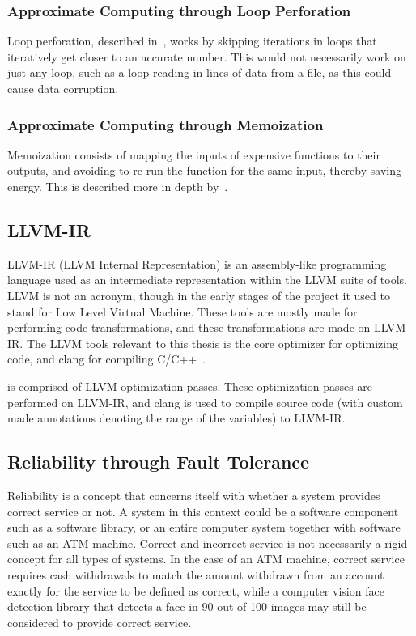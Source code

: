 \subsubsection{Approximate Computing through Loop Perforation}

Loop perforation, described in~\citet{li2018sculptor}, works by skipping iterations in loops that iteratively get closer to an accurate number. This would not necessarily work on just any loop, such as a loop reading in lines of data from a file, as this could cause data corruption.

\subsubsection{Approximate Computing through Memoization}

Memoization consists of mapping the inputs of expensive functions to their outputs, and avoiding to re-run the function for the same input, thereby saving energy. This is described more in depth by~\citet{mittal2016survey}.

\subsection{LLVM-IR}
LLVM-IR (LLVM Internal Representation) is an assembly-like programming language used as an intermediate representation within the LLVM suite of tools. LLVM is not an acronym, though in the early stages of the project it used to stand for Low Level Virtual Machine. These tools are mostly made for performing code transformations, and these transformations are made on LLVM-IR. The LLVM tools relevant to this thesis is the core optimizer for optimizing code, and clang for compiling C/C++~\citep{LLVM_homepage}.  %

\taffo{} is comprised of LLVM optimization passes. These optimization passes are performed on LLVM-IR, and clang is used to compile source code (with custom made annotations denoting the range of the variables) to LLVM-IR. %



\subsection{Reliability through Fault Tolerance}\label{section:Reliability_thorugh_fault_tolerance}
Reliability is a concept that concerns itself with whether a system provides correct service or not. A system in this context could be a software component such as a software library, or an entire computer system together with software such as an ATM machine. Correct and incorrect service is not necessarily a rigid concept for all types of systems. In the case of an ATM machine, correct service requires cash withdrawals to match the amount withdrawn from an account exactly for the service to be defined as correct, while a computer vision face detection library that detects a face in 90 out of 100 images may still be considered to provide correct service.

